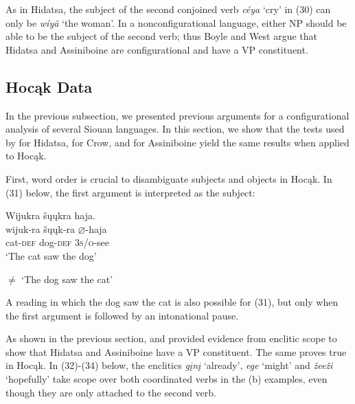 \documentclass[output=paper]{LSP/langsci}
\begin{document}
As in Hidatsa, the subject of the second conjoined verb \textit{c\'eya} `cry' in (30) can only be \textit{w\'iy\~a} `the woman'.  In a nonconfigurational language, either NP should be able to be the subject of the second verb; thus Boyle and West argue that Hidatsa and Assiniboine are configurational and have a VP constituent.

\subsection{Hoc\k{a}k Data}

In the previous subsection, we presented previous arguments for a configurational analysis of several Siouan languages.  In this section, we show that the tests used by \citet{Boyle2007} for Hidatsa, \citet{Graczyk1991} for Crow, and \citet{West2003} for Assiniboine yield the same results when applied to Hoc\k{a}k.
	
First, word order is crucial to disambiguate subjects and objects in Hoc\k{a}k.  In (31) below, the first argument is interpreted as the subject:

\begin{exe}
\ex 
\glll Wijukra	\v{s}\k{u}\k{u}kra 		haja.\\
wijuk-ra 		\v{s}\k{u}\k{u}k-ra 		$\varnothing$-haja \\
cat-\textsc{def} 		dog-\textsc{def} 	\textsc{3s/o}-see \\
\trans `The cat saw the dog'

$\neq$ `The dog saw the cat'
\end{exe}

A reading in which the dog saw the cat is also possible for (31), but only when the first argument is followed by an intonational pause.
	
As shown in the previous section, \citet{Boyle2007} and \citet{West2003} provided evidence from enclitic scope to show that Hidatsa and Assiniboine have a VP constituent.  The same proves true in Hoc\k{a}k.  In (32)-(34) below, the enclitics \textit{g\k{i}n\k{i}} `already', \textit{ege} `might' and \textit{\v{z}ee\v{z}i} `hopefully' take scope over both coordinated verbs in the (b) examples, even though they are only attached to the second verb.
\end{document}
